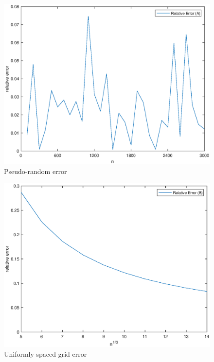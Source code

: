 \documentclass[11pt]{article}
\newcommand{\1}{\mathbbm{1}}
\begin{document}
\begin{figure}[h]
	\centering
		\includegraphics[width=\textwidth]{fig2.eps}
	\caption{ Pseudo-random error}
	\label{2a:1}
\end{figure}
\begin{figure}[h]
	\centering
		\includegraphics[width=\textwidth]{fig1.eps}
	\caption{Uniformly spaced grid error}
	\label{2a:1}
\end{figure}
\end{document}
